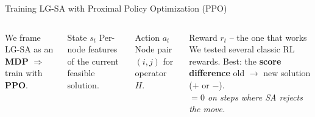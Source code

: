 \documentclass{beamer}
\newcommand{\highlight}[1]{\textcolor{myorange}{\textbf{#1}}}
\begin{document}
\begin{frame}{Training LG-SA with Proximal Policy Optimization (PPO)}
  \begin{columns}[T]
    \small We frame LG-SA as an \highlight{MDP} $\Rightarrow$ train with \highlight{PPO}. \smallskip
    
    \begin{block}{State $s_t$}
      \small Per-node features of the current feasible solution.
    \end{block}
    \vspace{0.1em}
    \begin{block}{Action $a_t$}
      \small Node pair $(i, j)$ for operator $H$.
    \end{block}
    \vspace{0.1em}
    \begin{block}{Reward $r_t$ -- the one that works}
      \small We tested several classic RL rewards. Best: the
      \highlight{score difference} old $\to$ new solution ($+$ or $-$).\\[0.2em]
      \emph{$=0$ on steps where SA rejects the move.}
    \end{block}


\end{columns}
\end{frame}
\end{document}

